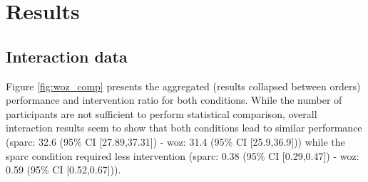 \section{Results}

\subsection{Interaction data}

Figure \ref{fig:woz_comp} presents the aggregated (results collapsed between orders) performance and intervention ratio for both conditions. While the number of participants are not sufficient to perform statistical comparison, overall interaction results seem to show that both conditions lead to similar performance (\gls{sparc}: 32.6 (95\% CI [27.89,37.31]) - \gls{woz}: 31.4 (95\% CI [25.9,36.9])) while the \gls{sparc} condition required less intervention (\gls{sparc}: 0.38 (95\% CI [0.29,0.47]) - \gls{woz}: 0.59 (95\% CI [0.52,0.67])). 

